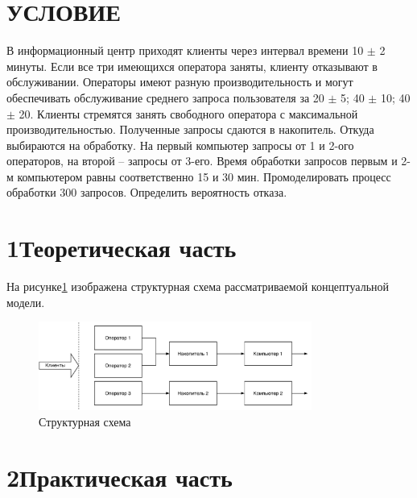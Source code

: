 \section*{\hfill{}УСЛОВИЕ\hfill{}}
В информационный центр приходят клиенты через интервал времени 10 $\pm$ 2 минуты. Если все три имеющихся оператора заняты, клиенту отказывают в обслуживании. Операторы имеют разную производительность и могут обеспечивать обслуживание среднего запроса пользователя за 20 $\pm$ 5; 40 $\pm$ 10; 40 $\pm$ 20. Клиенты стремятся занять свободного оператора с максимальной производительностью. Полученные запросы сдаются в накопитель. Откуда выбираются на обработку. На первый компьютер запросы от 1 и 2-ого операторов, на второй – запросы от 3-его. Время обработки запросов первым и 2-м компьютером равны соответственно 15 и 30 мин. Промоделировать процесс обработки 300 запросов. Определить вероятность отказа.

\section*{\hspace{1.25cm}1\quad{}Теоретическая часть}
На рисунке\ref{img:concept} изображена структурная схема рассматриваемой концептуальной модели.
\begin{figure}[H]
    \centering
    \includegraphics[width=0.8\textwidth]{pdf/concept.pdf}
    \caption{Структурная схема}
    \label{img:concept}
\end{figure}

\section*{\hspace{1.25cm}2\quad{}Практическая часть}


